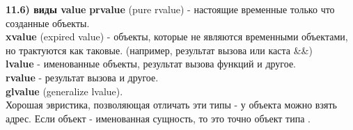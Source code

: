 \documentclass{article}
\begin{document}
\noindent \textbf{11.6) виды value}
\textbf{prvalue} (pure rvalue) - настоящие временные только что созданные объекты.\\
\textbf{xvalue} (expired value) - объекты, которые не являются временными объектами, но трактуются как таковые. (например, результат вызова  или каста \&\&\ti{>})\\
\textbf{lvalue} - именованные объекты, результат вызова функций  и другое.\\
\textbf{rvalue} - результат вызова  и другое.\\
\textbf{glvalue} (generalize lvalue).\\
Хорошая эвристика, позволяющая отличать эти типы - у  объекта можно взять адрес. Если объект - именованная сущность, то это точно объект типа .
\end{document}

